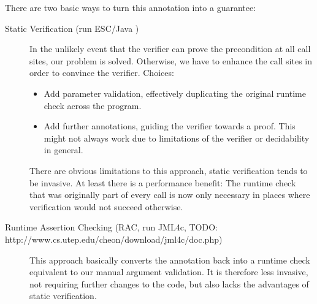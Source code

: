 There are two basic ways to turn this annotation into a guarantee:
\begin{description}
    \item[Static Verification (run ESC/Java \cite{leino2000esc})]
    In the unlikely event that the verifier can prove the precondition at all call sites, our problem is solved.
    Otherwise, we have to enhance the call sites in order to convince the verifier.
    Choices:
    \begin{itemize}
        \item 
        Add parameter validation, effectively duplicating the original runtime check across the program.
        \item
        Add further annotations, guiding the verifier towards a proof.
        This might not always work due to limitations of the verifier or decidability in general.
    \end{itemize}
    There are obvious limitations to this approach, static verification tends to be invasive.
    At least there is a performance benefit: 
    The runtime check that was originally part of every call is now only necessary in places where verification would not succeed otherwise.
    
    \item[Runtime Assertion Checking (RAC, run JML4c, TODO: http://www.cs.utep.edu/cheon/download/jml4c/doc.php)]
    This approach basically converts the annotation back into a runtime check equivalent to our manual argument validation.
    It is therefore less invasive, not requiring further changes to the code, but also lacks the advantages of static verification.
\end{description}



